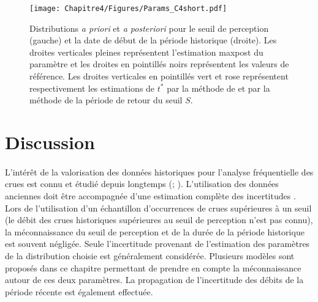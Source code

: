 	\begin{figure}[h]
		\centering
		\texttt{[image: Chapitre4/Figures/Params\_C4short.pdf]}	
		\caption{Distributions \textit{a priori} et \textit{a posteriori} pour le seuil de perception (gauche) et la date de début de la période historique (droite). Les droites verticales pleines représentent l'estimation maxpost du paramètre et les droites en pointillés noirs représentent les valeurs de référence. Les droites verticales en pointillés vert et rose représentent respectivement les estimations de $t^{*}$ par la méthode de \citet{prosdocimi_german_2018} et par la méthode de la période de retour du seuil $S$.}
		\label{fig:Params_C4short}
	\end{figure}
	
	\FloatBarrier
	
	\section{Discussion}
	\label{sec:Discussion}
	\paragraph{} L'intérêt de la valorisation des données historiques pour l'analyse fréquentielle des crues est connu et étudié depuis longtemps (\cite{benson_use_1950}; \cite{stedinger_flood_1986}). L'utilisation des données anciennes doit être accompagnée d'une estimation complète des incertitudes \citep{kjeldsen_documentary_2014}. Lors de l'utilisation d'un échantillon d'occurrences de crues supérieures à un seuil (le débit des crues historiques supérieures au seuil de perception n'est pas connu), la méconnaissance du seuil de perception et de la durée de la période historique est souvent négligée. Seule l'incertitude provenant de l'estimation des paramètres de la distribution choisie est généralement considérée. Plusieurs modèles sont proposés dans ce chapitre permettant de prendre en compte la méconnaissance autour de ces deux paramètres. La propagation de l'incertitude des débits de la période récente est également effectuée. 
	
